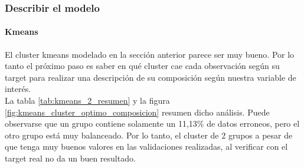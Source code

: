 \subsubsection{\textbf{Describir el modelo}}

\paragraph{\textbf{Kmeans}}
El cluster kmeans modelado en la sección anterior parece ser muy bueno. Por lo tanto el próximo paso es saber en qué cluster cae cada observación según su target para realizar una descripción de su composición según nuestra variable de interés.\\
La tabla \ref{tab:kmeans_2_resumen} y la figura \ref{fig:kmeans_cluster_optimo_composicion} resumen dicho análisis. Puede observarse que un grupo contiene solamente un 11,13\% de datos
erroneos, pero el otro grupo está muy balanceado. Por lo tanto, el
cluster de 2 grupos a pesar de que tenga muy buenos valores en las
validaciones realizadas, al verificar con el target real no da un buen resultado.

\begin{table}[!h]
	
	\caption{\label{tab:kmeans_2_resumen}Resumen composición de cluster Kmeans según clase desertor}
	\centering
\end{table}


